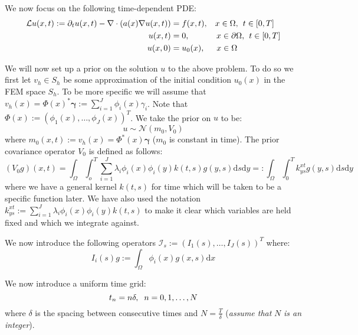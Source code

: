 \documentclass{article}
\theoremstyle{definition}
\theoremstyle{remark}
\theoremstyle{remark}
\begin{document}
\setlength\parskip{10pt}
\setlength\parindent{20pt}

\noindent We now focus on the following time-dependent PDE:
\begin{align}
        \mathcal{L}u(x,t) := \partial_{t}u(x,t) -\nabla\cdot(a(x)\nabla u(x,t))&=f(x,t), \hspace{0.3cm} x\in\Omega, \hspace{0.15cm} t\in[0,T] \\
        u(x,t) &= 0, \hspace{1.15cm} x\in\partial\Omega, \hspace{0.15cm} t\in[0,T] \\
        u(x,0) &= u_{0}(x), \hspace{0.5cm} x\in\Omega
\end{align}

We will now set up a prior on the solution $u$ to the above problem. To do so we first let $v_{h}\in S_{h}$ be some approximation of the initial condition $u_{0}(x)$ in the FEM space $S_{h}$. To be more specific we will assume that $v_{h}(x)=\Phi(x)^{*}\boldsymbol{\gamma}:=\sum_{i=1}^{J}\phi_{i}(x)\gamma_{i}$. Note that $\Phi(x):=(\phi_{1}(x),\dots,\phi_{J}(x))^{T}$. We take the prior on $u$ to be:
\begin{equation}
    u\sim\mathcal{N}(m_{0},V_{0})
\end{equation}
where $m_{0}(x,t):=v_{h}(x)=\Phi^{*}(x)\boldsymbol{\gamma}$ ($m_{0}$ is constant in time). The prior covariance operator $V_{0}$ is defined as follows:
\begin{equation}
    (V_{0}g)(x,t)=\int_{\Omega}\int_{o}^{T}\sum_{i=1}^{J}\lambda_{i}\phi_{i}(x)\phi_{i}(y)k(t,s)g(y,s)\mathrm{d}s\mathrm{d}y =: \int_{\Omega}\int_{0}^{T}k_{ys}^{xt}g(y,s)\mathrm{d}s\mathrm{d}y
\end{equation}
where we have a general kernel $k(t,s)$ for time which will be taken to be a specific function later. We have also used the notation $k_{ys}^{xt}:=\sum_{i=1}^{J}\lambda_{i}\phi_{i}(x)\phi_{i}(y)k(t,s)$ to make it clear which variables are held fixed and which we integrate against.

\noindent We now introduce the following operators $\mathcal{I}_{s}:=(I_{1}(s),\dots,I_{J}(s))^{T}$ where:
\begin{equation}
    I_{i}(s)g:=\int_{\Omega}\phi_{i}(x)g(x,s)\mathrm{d}x
\end{equation}

\noindent We now introduce a uniform time grid:
\begin{equation*}
    t_{n}=n\delta, \hspace{0.2cm} n=0,1,\dots,N
\end{equation*}
where $\delta$ is the spacing between consecutive times and $N=\frac{T}{\delta}$ (\textit{assume that} $N$ \textit{is an integer}).
\end{document}
